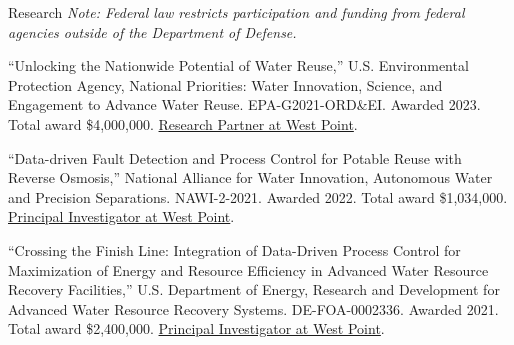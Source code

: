 \documentclass{resume} %
\begin{document}

\begin{rSection}{Research}
\emph{Note: Federal law restricts participation and funding from federal agencies outside of the Department of Defense.}

``Unlocking the Nationwide Potential of Water Reuse,'' U.S. Environmental Protection Agency, National Priorities: Water Innovation, Science, and Engagement to Advance Water Reuse. EPA-G2021-ORD\&EI. Awarded 2023. Total award \$4,000,000. \ul{Research Partner at West Point}.

``Data-driven Fault Detection and Process Control for Potable Reuse with Reverse Osmosis,'' National Alliance for Water Innovation, Autonomous Water and Precision Separations. NAWI-2-2021. Awarded 2022. Total award \$1,034,000. \ul{Principal Investigator at West Point}.

``Crossing the Finish Line: Integration of Data-Driven Process Control for Maximization of Energy and Resource Efficiency in Advanced Water Resource Recovery Facilities,'' U.S. Department of Energy, Research and Development for Advanced Water Resource Recovery Systems. DE-FOA-0002336. Awarded 2021. Total award \$2,400,000. \ul{Principal Investigator at West Point}.
\end{rSection}

\newpage

\end{document}
